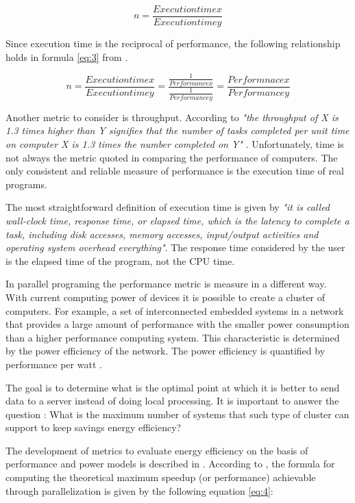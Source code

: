 \begin{equation}\label{eq:2}
n = \frac{Execution time x}{Execution time y}
\end{equation}

Since execution time is the reciprocal of performance, the following
relationship holds in formula \ref{eq:3} from \cite{Hennessy}.

\begin{equation}\label{eq:3}
n = \frac{Execution time x}{Execution time y} = \frac{\frac{1}{Performance
x}}{\frac{1}{Performance y}} = \frac{Performnace x}{Performance y}
\end{equation}

Another metric to consider is throughput. According to \cite{Hennessy}
\textit{"the throughput of X is 1.3 times higher than Y signifies that the
number of tasks completed per unit time on computer X is 1.3 times the number
completed on Y"} . Unfortunately, time is not always the metric quoted in
comparing the performance of computers. The only consistent and reliable
measure of performance is the execution time of real programs. 

The most straightforward definition of execution time is given by
\cite{Hennessy} \textit{"it is called wall-clock time, response time, or elapsed
time, which is the latency to complete a task, including disk accesses, memory
accesses, input/output activities and operating system overhead everything"}.
The response time considered by the user is the elapsed time of the program, not the CPU
time.

In parallel programing the performance metric is measure in a different way.
With current computing power of devices it is possible to create a cluster of
computers. For example, a set of interconnected embedded systems in a network
that provides a large amount of performance with the smaller power consumption
than a higher performance computing system. This characteristic is determined
by the power efficiency of the network. The power efficiency is quantified by
performance per watt \cite{Jun}.

The goal is to determine what is the optimal point at which it is better to send
data to a server instead of doing local processing. It is important to answer
the question : What is the maximum number of systems that such type of cluster
can support to keep savings energy efficiency? 

The development of metrics to evaluate energy efficiency on the basis of
performance and power models is described in \cite{Dong}. According to
\cite{Dong}, the formula for computing the theoretical maximum speedup (or
performance) achievable through parallelization is given by the following
equation \ref{eq:4}:

